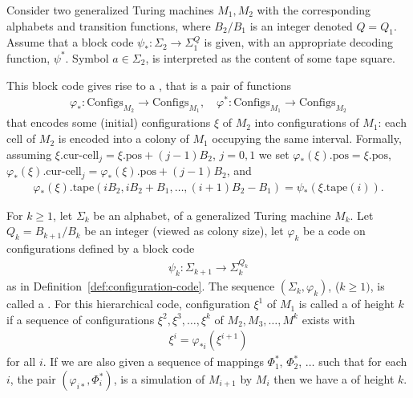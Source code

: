 \documentclass[11pt]{memoir}
\theoremstyle{definition} %
\renewcommand{\ge}{\geq}
\def\B{B}
\newcommand{\Configs}{\mathrm{Configs}}
\newcommand{\pos}{\mathrm{pos}}
\newcommand{\curcell}{\textrm{cur-cell}}
\newcommand{\Q}{Q} %
\newcommand{\tape}{\mathrm{tape}}
\begin{document}
\begin{definition}\label{def:configuration-code}
\begin{sloppypar}
 Consider two generalized Turing machines \( M_{1},M_{2} \) with the corresponding
alphabets and transition functions, where \( \B_{2}/\B_{1} \) is an integer denoted \( \Q=\Q_{1} \).
Assume that a block code
\(
   \psi_{*}:\Sigma_{2}\to\Sigma_{1}^{\Q}
\)
is given, with an appropriate decoding function, \( \psi^{*} \).
Symbol \( a\in\Sigma_{2} \), is interpreted as the content of some tape square.
\end{sloppypar}

This block code gives rise to a , that is a pair of functions
    \begin{align*}
        \varphi_{*} :\Configs_{M_{2}} \to \Configs_{M_{1}},
        \quad
        \varphi^{*}:\Configs_{M_{1}} \to \Configs_{M_{2}}
    \end{align*}
    that encodes some (initial) configurations \( \xi \) of \( M_{2} \) into configurations of \( M_{1} \):
    each cell of \( M_{2} \) is encoded into a colony of \( M_{1} \) occupying the same interval.
    Formally, assuming \( \xi.\curcell_{j}=\xi.\pos+(j-1)\B_{2} \), \( j=0,1 \) 
    we set \( \varphi_{*}(\xi).\pos = \xi.\pos \),
    \( \varphi_{*}(\xi).\curcell_{j}= \varphi_{*}(\xi).\pos+(j-1)\B_{2} \),
  and
\begin{align*}
 \varphi_{*}(\xi).\tape(i\B_{2},i\B_{2}+\B_{1}, \dots, (i+1)\B_{2} - \B_{1}) = \psi_{*}(\xi.\tape(i)).
 \end{align*}
 \end{definition}


\begin{definition}\label{def:hierarchical-code}
For \( k\ge 1 \), let \( \Sigma_{k} \) be an alphabet, of a generalized Turing machine \( M_{k} \).
Let \( \Q_{k}=\B_{k+1}/\B_{k} \) be an integer (viewed as colony size), let \( \varphi_{k} \)
be a code on configurations defined by a block code
  \begin{align*}
       \psi_{k}: \Sigma_{k+1}\to \Sigma_{k}^{\Q_{k}}
  \end{align*}
as in Definition~\ref{def:configuration-code}.
The sequence \( (\Sigma_{k},\varphi_{k}) \), (\( k\ge 1) \),  is
called a .
For this hierarchical code, configuration \( \xi^{1} \) of \( M_{1} \)
is called a  of height \( k \) if a sequence
of configurations \( \xi^{2},\xi^{3},\dots,\xi^{k} \) of \( M_{2},M_{3},\dots,M^{k} \) exists with
\begin{align*}
 \xi^{i}=\varphi_{*i}(\xi^{i+1})
 \end{align*} 
for all \( i \).
If we are also given a sequence of mappings \( \Phi^{*}_{1} \), \( \Phi^{*}_{2} \), \( \dots \) 
such that for each \( i \), the pair \( (\varphi_{i*},\Phi_{i}^{*}) \),
is a simulation of \( M_{i+1} \) by \( M_{i} \) 
then we have a  of height \( k \).
\end{definition}
\end{document}
